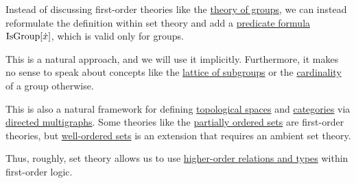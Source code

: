 \begin{remark}\label{rem:first_order_theories_in_zfc}
  Instead of discussing first-order theories like the \hyperref[def:group/theory]{theory of groups}, we can instead reformulate the definition within set theory and add a \hyperref[con:predicate_formula]{predicate formula} \( \op{IsGroup}[\synx] \), which is valid only for groups.

  This is a natural approach, and we will use it implicitly. Furthermore, it makes no sense to speak about concepts like the \hyperref[thm:substructures_form_complete_lattice]{lattice of subgroups} or the \hyperref[def:cardinal]{cardinality} of a group otherwise.

  This is also a natural framework for defining \hyperref[def:topological_space]{topological spaces} and \hyperref[def:category]{categories} via \hyperref[def:directed_multigraph]{directed multigraphs}. Some theories like the \hyperref[def:partially_ordered_set]{partially ordered sets} are first-order theories, but \hyperref[def:well_ordered_set]{well-ordered sets} is an extension that requires an ambient set theory.

  Thus, roughly, set theory allows us to use \hyperref[rem:higher_order_logic]{higher-order relations and types} within first-order logic.
\end{remark}
